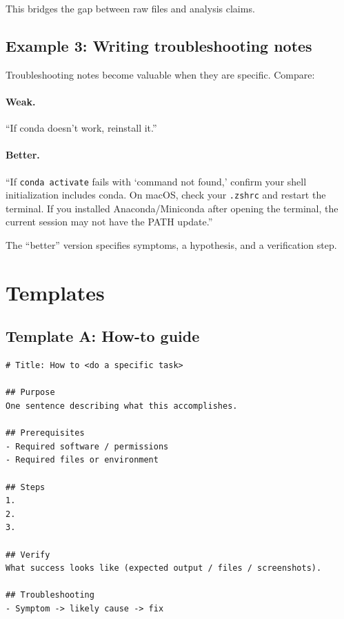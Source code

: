 This bridges the gap between raw files and analysis claims.

\subsection{Example 3: Writing troubleshooting notes}
Troubleshooting notes become valuable when they are specific. Compare:

\paragraph{Weak.} “If conda doesn’t work, reinstall it.”

\paragraph{Better.} “If \texttt{conda activate} fails with ‘command not found,’ confirm your shell initialization includes conda. On macOS, check your \texttt{.zshrc} and restart the terminal. If you installed Anaconda/Miniconda after opening the terminal, the current session may not have the PATH update.”

The “better” version specifies symptoms, a hypothesis, and a verification step.

\section{Templates}
\subsection{Template A: How-to guide}
\begin{verbatim}
# Title: How to <do a specific task>

## Purpose
One sentence describing what this accomplishes.

## Prerequisites
- Required software / permissions
- Required files or environment

## Steps
1.
2.
3.

## Verify
What success looks like (expected output / files / screenshots).

## Troubleshooting
- Symptom -> likely cause -> fix
\end{verbatim}


